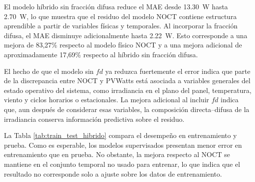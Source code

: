 \documentclass[12pt, letterpaper]{article}
\begin{document}
El modelo h\'ibrido sin fracci\'on difusa reduce el MAE desde \SI{13.30}{\watt} hasta \SI{2.70}{\watt}, lo que muestra que el residuo del modelo NOCT contiene estructura aprendible a partir de variables f\'isicas y temporales. Al incorporar la fracci\'on difusa, el MAE disminuye adicionalmente hasta \SI{2.22}{\watt}. Esto corresponde a una mejora de 83,27\% respecto al modelo f\'isico NOCT y a una mejora adicional de aproximadamente 17,69\% respecto al h\'ibrido sin fracci\'on difusa.

El hecho de que el modelo sin \(fd\) ya reduzca fuertemente el error indica que parte de la discrepancia entre NOCT y PVWatts est\'a asociada a variables generales del estado operativo del sistema, como irradiancia en el plano del panel, temperatura, viento y ciclos horarios o estacionales. La mejora adicional al incluir \(fd\) indica que, aun despu\'es de considerar esas variables, la composici\'on directa--difusa de la irradiancia conserva informaci\'on predictiva sobre el residuo.

La Tabla \ref{tab:train_test_hibrido} compara el desempe\~no en entrenamiento y prueba. Como es esperable, los modelos supervisados presentan menor error en entrenamiento que en prueba. No obstante, la mejora respecto al NOCT se mantiene en el conjunto temporal no usado para entrenar, lo que indica que el resultado no corresponde solo a ajuste sobre los datos de entrenamiento.

\begin{table}[H]
\centering
\caption{Comparaci\'on de MAE y RMSE en entrenamiento y prueba.}
\label{tab:train_test_hibrido}
\end{table}
\end{document}
